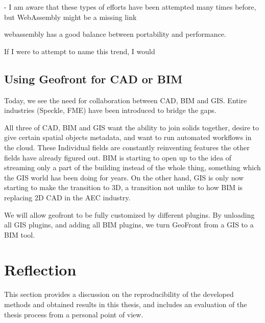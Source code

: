 - I am aware that these types of efforts have been attempted many times before, but WebAssembly might be a missing link 

\m{->} webassembly has a good balance between portability and performance.

\m{->}

If I were to attempt to name this trend, I would

\subsection{Using Geofront for CAD or  BIM}


Today, we see the need for collaboration between CAD, BIM and GIS. Entire industries (Speckle, FME) have been introduced to bridge the gaps. 

All three of CAD, BIM and GIS want the ability to join solids together, desire to give certain spatial objects metadata, and want to run automated workflows in the cloud. These Individual fields are constantly reinventing features the other fields have already figured out. BIM is starting to open up to the idea of streaming only a part of the building instead of the whole thing, something which the GIS world has been doing for years. On the other hand, GIS is only now starting to make the transition to 3D, a transition not unlike to how BIM is replacing 2D CAD in the AEC industry. 

We will allow geofront to be fully customized by different plugins. By unloading all GIS plugins, and adding all BIM plugins, we turn GeoFront from a GIS to a BIM tool.


\section{Reflection}
\label{sec:reflection}

This section provides a discussion on the reproducibility of the developed methods and obtained results in this thesis, and includes an evaluation of the thesis process from a personal point of view.

